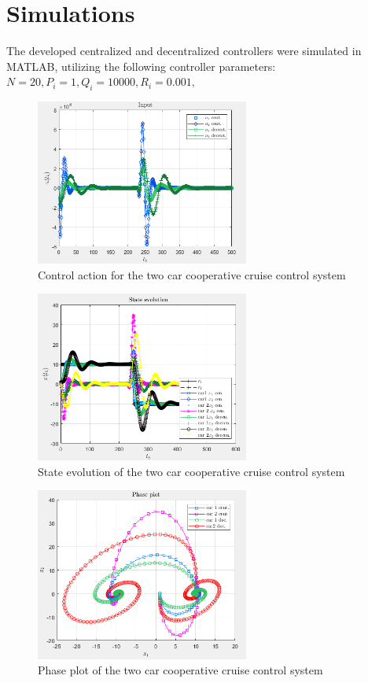 \documentclass[a4paper,twocolumn]{article}
\begin{document}
\section{Simulations}\label{sec:sim}

The developed centralized and decentralized controllers were simulated in MATLAB, utilizing the following controller parameters:
$ N = 20, 
P_i = 1, 
Q_i = 10000, 
R_i = 0.001, 
$

 \begin{figure}[!ht]
 	\centering
 	\includegraphics[width=7cm]{cen_dec_unc_in.png}
 	\caption{Control action for the two car cooperative cruise control system}
 	\label{fig:control action}
 \end{figure}
 
 \begin{figure}[!ht]
 	\centering
 	\includegraphics[width=7cm]{cen_dec_unc_out.png}
 	\caption{State evolution of the two car cooperative cruise control system}
 	\label{fig:output}
 \end{figure}
 
\vspace{6cm}

 \begin{figure}[!h]
 	\centering
 	\includegraphics[width=7cm]{cen_dec_unc_states.png}
 	\caption{Phase plot of the two car cooperative cruise control system}
 	\label{fig:states}
 \end{figure}
\end{document}
